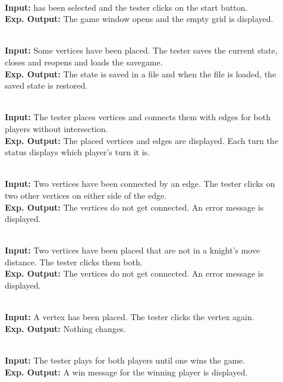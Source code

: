 \begin{description}
	\item[] \textbf{} \\
	\textbf{Input:} \twixt has been selected and the tester clicks on the start button. \\
	\textbf{Exp. Output:} The game window opens and the empty grid is displayed.
	
	\item[] \textbf{} \\
	\textbf{Input:} Some vertices have been placed. The tester saves the current state, closes and reopens \twixt and loads the savegame. \\
	\textbf{Exp. Output:} The state is saved in a file and when the file is loaded, the saved state is restored.
	
	\item[] \textbf{} \\
	\textbf{Input:} The tester places vertices and connects them with edges for both players without intersection. \\
	\textbf{Exp. Output:} The placed vertices and edges are displayed. Each turn the status displays which player's turn it is.
	
	\item[] \textbf{} \\
	\textbf{Input:} Two vertices have been connected by an edge. The tester clicks on two other vertices on either side of the edge. \\
	\textbf{Exp. Output:} The vertices do not get connected. An error message is displayed.
	
	\item[] \textbf{} \\
	\textbf{Input:} Two vertices have been placed that are not in a knight's move distance. The tester clicks them both. \\
	\textbf{Exp. Output:} The vertices do not get connected. An error message is displayed.
	
	\item[] \textbf{} \\
	\textbf{Input:} A vertex has been placed. The tester clicks the vertex again. \\
	\textbf{Exp. Output:} Nothing changes.
	
	\item[] \textbf{} \\
	\textbf{Input:} The tester plays for both players until one wins the game. \\
	\textbf{Exp. Output:} A win message for the winning player is displayed.
\end{description}

